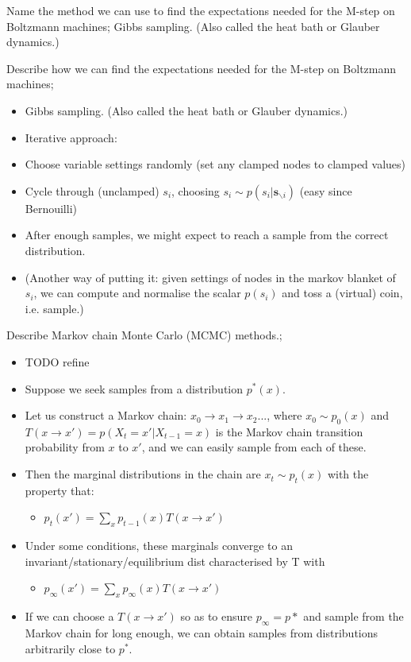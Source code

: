 \documentclass{article}
\begin{document}
Name the method we can use to find the expectations needed for the M-step on Boltzmann machines; Gibbs sampling. (Also called the heat bath or Glauber dynamics.)

Describe how we can find the expectations needed for the M-step on Boltzmann machines; \begin{itemize} \item Gibbs sampling. (Also called the heat bath or Glauber dynamics.) \item Iterative approach: \item Choose variable settings randomly (set any clamped nodes to clamped values) \item Cycle through (unclamped) $s_i$, choosing $s_i \sim p(s_i|\mathbf{s}_{\backslash i})$ (easy since Bernouilli) \item After enough samples, we might expect to reach a sample from the correct distribution. \item (Another way of putting it: given settings of nodes in the markov blanket of $s_i$, we can compute and normalise the scalar $p(s_i)$ and toss a (virtual) coin, i.e. sample.) \end{itemize}

Describe Markov chain Monte Carlo (MCMC) methods.; \begin{itemize} \item TODO refine \item Suppose we seek samples from a distribution $p^*(x)$. \item Let us construct a Markov chain: $x_0 \rightarrow x_1 \rightarrow x_2 ... $, where $x_0 \sim p_0(x)$ and $T(x\rightarrow x') = p(X_t = x' | X_{t-1} = x)$ is the Markov chain transition probability from $x$ to $x'$, and we can easily sample from each of these. \item Then the marginal distributions in the chain are $x_t \sim p_t(x)$ with the property that: \begin{itemize} \item $p_t(x') = \sum_x p_{t-1}(x) T (x\rightarrow x')$ \end{itemize} \item Under some conditions, these marginals converge to an invariant/stationary/equilibrium dist characterised by T with \begin{itemize} \item $p_{\infty}(x') = \sum_x p_{\infty}(x)T(x\rightarrow x')$ \end{itemize} \item If we can choose a $T(x\rightarrow x')$ so as to ensure $p_{\infty} = p*$ and sample from the Markov chain for long enough, we can obtain samples from distributions arbitrarily close to $p^*$. \end{itemize}
\end{document}
